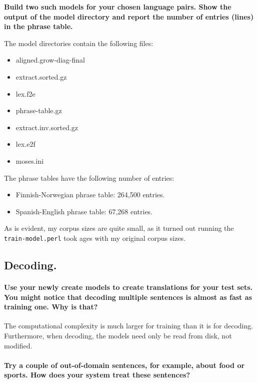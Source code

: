 \documentclass[11pt,a4paper]{article}
\begin{document}
      \textbf{Build two such models for your chosen language pairs.
        Show the output of the model directory and report the number of entries (lines) in the phrase table.
      }

      The model directories contain the following files:

      \begin{itemize}
        \item aligned.grow-diag-final
        \item extract.sorted.gz
        \item lex.f2e
        \item phrase-table.gz
        \item extract.inv.sorted.gz
        \item lex.e2f
        \item moses.ini
      \end{itemize}

      \noindent
      The phrase tables have the following number of entries:

      \begin{itemize}
        \item Finnish-Norwegian phrase table: 264,500 entries.
        \item Spanish-English phrase table: 67,268 entries.
      \end{itemize}

      As is evident, my corpus sizes are quite small, as it turned out running the \texttt{train-model.perl} took ages with my original corpus sizes.

    \subsection{Decoding.} %

      \paragraph{Use your newly create models to create translations for your test sets.
      You might notice that decoding multiple sentences is almost as fast as training one. Why is that?}

      The computational complexity is much larger for training than it is for decoding.
      Furthermore, when decoding, the models need only be read from disk, not modified.

      \paragraph{Try a couple of out-of-domain sentences, for example, about food or sports. How does your system treat these sentences?}
\end{document}
